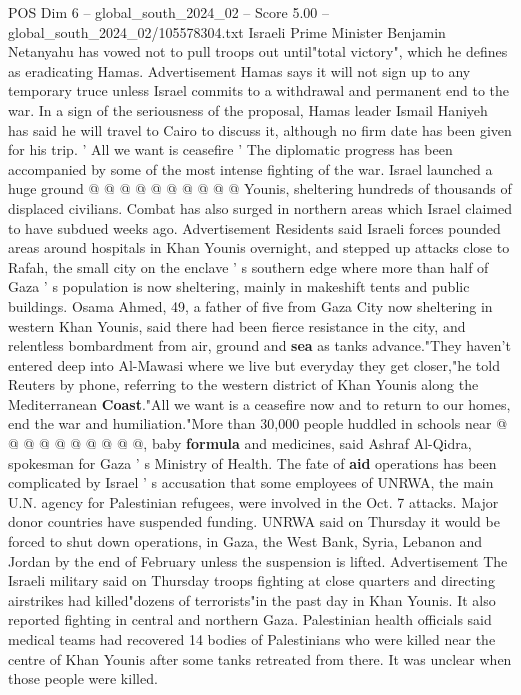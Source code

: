 \begin{textsample}{POS Dim 6 – global\_south\_2024\_02 – Score 5.00 – global\_south\_2024\_02/105578304.txt}
Israeli Prime Minister Benjamin Netanyahu has vowed not to pull troops out until"total victory", which he defines as eradicating Hamas.
Advertisement Hamas says it will not sign up to any temporary truce unless Israel commits to a withdrawal and permanent end to the war.
In a sign of the seriousness of the proposal, Hamas leader Ismail Haniyeh has said he will travel to Cairo to discuss it, although no firm date has been given for his trip. ' All we want is ceasefire ' The diplomatic progress has been accompanied by some of the most intense fighting of the war.
Israel launched a huge ground @ @ @ @ @ @ @ @ @ @ Younis, sheltering hundreds of thousands of displaced civilians.
Combat has also surged in northern areas which Israel claimed to have subdued weeks ago.
Advertisement Residents said Israeli forces pounded areas around hospitals in Khan Younis overnight, and stepped up attacks close to Rafah, the small city on the enclave ' s southern edge where more than half of Gaza ' s population is now sheltering, mainly in makeshift tents and public buildings.
Osama Ahmed, 49, a father of five from Gaza City now sheltering in western Khan Younis, said there had been fierce resistance in the city, and relentless bombardment from air, ground and \textbf{sea} as tanks advance."They haven't entered deep into Al-Mawasi where we live but everyday they get closer,"he told Reuters by phone, referring to the western district of Khan Younis along the Mediterranean \textbf{Coast}."All we want is a ceasefire now and to return to our homes, end the war and humiliation."More than 30,000 people huddled in schools near @ @ @ @ @ @ @ @ @ @, baby \textbf{formula} and medicines, said Ashraf Al-Qidra, spokesman for Gaza ' s Ministry of Health.
The fate of \textbf{aid} operations has been complicated by Israel ' s accusation that some employees of UNRWA, the main U.N. agency for Palestinian refugees, were involved in the Oct. 7 attacks.
Major donor countries have suspended funding.
UNRWA said on Thursday it would be forced to shut down operations, in Gaza, the West Bank, Syria, Lebanon and Jordan by the end of February unless the suspension is lifted.
Advertisement The Israeli military said on Thursday troops fighting at close quarters and directing airstrikes had killed"dozens of terrorists"in the past day in Khan Younis.
It also reported fighting in central and northern Gaza.
Palestinian health officials said medical teams had recovered 14 bodies of Palestinians who were killed near the centre of Khan Younis after some tanks retreated from there.
It was unclear when those people were killed.

\end{textsample}
